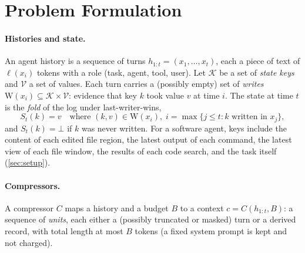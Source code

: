 \section{Problem Formulation}
\label{sec:formulation}

\paragraph{Histories and state.} An agent history is a sequence of turns
$h_{1:t}=(x_1,\dots,x_t)$, each a piece of text of $\ell(x_i)$ tokens with a
role (task, agent, tool, user). Let $\mathcal{K}$ be a set of \emph{state keys}
and $\mathcal{V}$ a set of values. Each turn carries a (possibly empty) set of
\emph{writes} $\mathrm{W}(x_i)\subseteq\mathcal{K}\times\mathcal{V}$: evidence
that key $k$ took value $v$ at time $i$. The state at time $t$ is the
\emph{fold} of the log under last-writer-wins,
\begin{equation}
  S_t(k) = v \quad\text{where } (k,v)\in \mathrm{W}(x_i),\; i=\max\{j\le t: k \text{ written in } x_j\},
\end{equation}
and $S_t(k)=\bot$ if $k$ was never written. For a software agent, keys include
the content of each edited file region, the latest output of each command, the
latest view of each file window, the results of each code search, and the task
itself (\cref{sec:setup}).

\paragraph{Compressors.} A compressor $C$ maps a history and a budget $B$ to a
context $c=C(h_{1:t},B)$: a sequence of \emph{units}, each either a (possibly
truncated or masked) turn or a derived record, with total length at most $B$
tokens (a fixed system prompt is kept and not charged).

